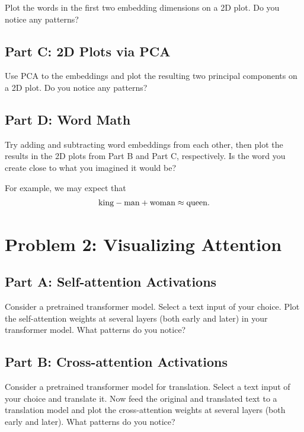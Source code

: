 \documentclass{article}
\begin{document}
Plot the words in the first two embedding dimensions on a 2D plot.
Do you notice any patterns?

\subsection*{Part C: 2D Plots via PCA}

Use PCA to the embeddings and plot the resulting two principal components on a 2D plot.
Do you notice any patterns?

\subsection*{Part D: Word Math}

Try adding and subtracting word embeddings from each other, then plot the results in the 2D plots from Part B and Part C, respectively.
Is the word you create close to what you imagined it would be?

For example, we may expect that
\begin{align*}
    \textnormal{king} - \textnormal{man} + \textnormal{woman} \approx \textnormal{queen}.
\end{align*}

%

\newpage
\section*{Problem 2: Visualizing Attention}

\subsection*{Part A: Self-attention Activations}

Consider a pretrained transformer model.
Select a text input of your choice.
Plot the self-attention weights at several layers (both early and later) in your transformer model. What patterns do you notice?

\subsection*{Part B: Cross-attention Activations}

Consider a pretrained transformer model for translation.
Select a text input of your choice and translate it.
Now feed the original and translated text to a translation model and plot the cross-attention weights at several layers (both early and later). What patterns do you notice?
\end{document}
